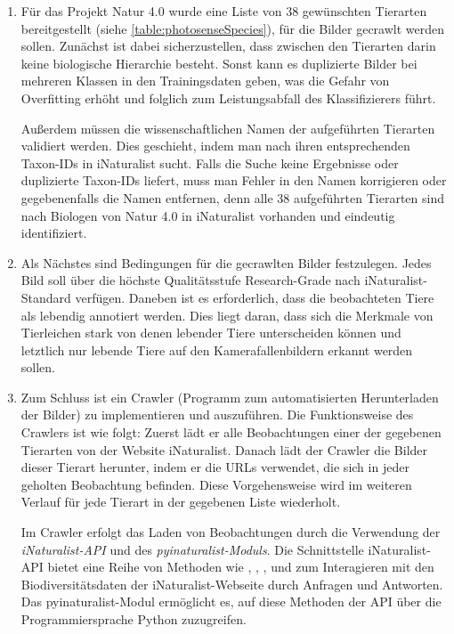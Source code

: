 \begin{enumerate}
	\item Für das Projekt Natur 4.0 wurde eine Liste von 38 gewünschten Tierarten bereitgestellt (siehe \autoref{table:photosenseSpecies}), für die Bilder gecrawlt werden sollen. Zunächst ist dabei sicherzustellen, dass zwischen den Tierarten darin keine biologische Hierarchie besteht. Sonst kann es duplizierte Bilder bei mehreren Klassen in den Trainingsdaten geben, was die Gefahr von Overfitting erhöht und folglich zum Leistungsabfall des Klassifizierers führt. 
	
	Außerdem müssen die wissenschaftlichen Namen der aufgeführten Tierarten validiert werden. Dies geschieht, indem man nach ihren entsprechenden Taxon-IDs in iNaturalist sucht. Falls die Suche keine Ergebnisse oder duplizierte Taxon-IDs liefert, muss man Fehler in den Namen korrigieren oder gegebenenfalls die Namen entfernen, denn alle 38 aufgeführten Tierarten sind nach Biologen von Natur 4.0 in iNaturalist vorhanden und eindeutig identifiziert.
	
	\item Als Nächstes sind Bedingungen für die gecrawlten Bilder festzulegen. Jedes Bild soll über die höchste Qualitätsstufe Research-Grade nach iNaturalist-Standard verfügen. Daneben ist es erforderlich, dass die beobachteten Tiere als lebendig annotiert werden. Dies liegt daran, dass sich die Merkmale von Tierleichen stark von denen lebender Tiere unterscheiden können und letztlich nur lebende Tiere auf den Kamerafallenbildern erkannt werden sollen.
	
	\item Zum Schluss ist ein Crawler (Programm zum automatisierten Herunterladen der Bilder) zu implementieren und auszuführen. Die Funktionsweise des Crawlers ist wie folgt: Zuerst lädt er alle Beobachtungen einer der gegebenen Tierarten von der Website iNaturalist.	Danach lädt der Crawler die Bilder dieser Tierart herunter, indem er die URLs verwendet, die sich in jeder geholten Beobachtung befinden. Diese Vorgehensweise wird im weiteren Verlauf für jede Tierart in der gegebenen Liste wiederholt. 
	
	Im Crawler erfolgt das Laden von Beobachtungen durch die Verwendung der \emph{iNaturalist-API} und des \emph{pyinaturalist-Moduls}. Die Schnittstelle iNaturalist-API bietet eine Reihe von Methoden wie , , ,  und  zum Interagieren mit den Biodiversitätsdaten der iNaturalist-Webseite durch Anfragen und Antworten. Das pyinaturalist-Modul ermöglicht es, auf diese Methoden der API über die Programmiersprache Python zuzugreifen.
	
	
\end{enumerate}

